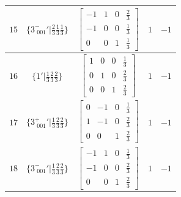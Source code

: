 \documentclass[fleqn,8pt]{jsarticle}
\begin{document}
\begin{longtable}{ccccc}
$ 15 $ & $ \{3^{-}_{\,\,001}{}'|\frac{2}{3} \frac{1}{3} \frac{1}{3}\} $ & $ \begin{bmatrix} -1 & 1 & 0 & \frac{2}{3} \\ -1 & 0 & 0 & \frac{1}{3} \\ 0 & 0 & 1 & \frac{1}{3} \end{bmatrix} $ & $ 1 $ & $ -1 $ \\ \hline
$ 16 $ & $ \{1{}'|\frac{1}{3} \frac{2}{3} \frac{2}{3}\} $ & $ \begin{bmatrix} 1 & 0 & 0 & \frac{1}{3} \\ 0 & 1 & 0 & \frac{2}{3} \\ 0 & 0 & 1 & \frac{2}{3} \end{bmatrix} $ & $ 1 $ & $ -1 $ \\ \hline
$ 17 $ & $ \{3^{+}_{\,\,001}{}'|\frac{1}{3} \frac{2}{3} \frac{2}{3}\} $ & $ \begin{bmatrix} 0 & -1 & 0 & \frac{1}{3} \\ 1 & -1 & 0 & \frac{2}{3} \\ 0 & 0 & 1 & \frac{2}{3} \end{bmatrix} $ & $ 1 $ & $ -1 $ \\ \hline
$ 18 $ & $ \{3^{-}_{\,\,001}{}'|\frac{1}{3} \frac{2}{3} \frac{2}{3}\} $ & $ \begin{bmatrix} -1 & 1 & 0 & \frac{1}{3} \\ -1 & 0 & 0 & \frac{2}{3} \\ 0 & 0 & 1 & \frac{2}{3} \end{bmatrix} $ & $ 1 $ & $ -1 $ \\
\end{longtable}
\end{document}
